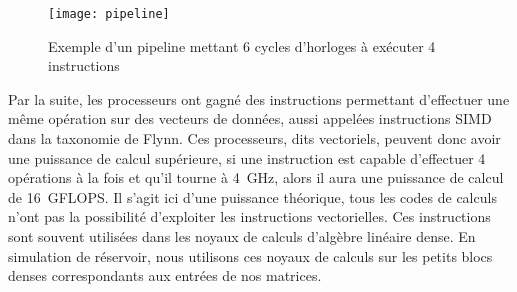 \begin{figure}[!h]
  \centering
  \texttt{[image: pipeline]}
  \caption{Exemple d'un pipeline mettant 6 cycles d'horloges à exécuter 4 instructions}
  \label{fig:pipeline}
\end{figure}



Par la suite, les processeurs ont gagné des instructions permettant d'effectuer une même opération sur des vecteurs de données, aussi appelées instructions SIMD dans la taxonomie de Flynn.
%
Ces processeurs, dits vectoriels, peuvent donc avoir une puissance de calcul supérieure, si une instruction est capable d'effectuer 4 opérations à la fois et qu'il tourne à 4~GHz, alors il aura une puissance de calcul de 16~GFLOPS.
%
Il s'agit ici d'une puissance théorique, tous les codes de calculs n'ont pas la possibilité d'exploiter les instructions vectorielles.
%
Ces instructions sont souvent utilisées dans les noyaux de calculs d'algèbre linéaire dense.
%
En simulation de réservoir, nous utilisons ces noyaux de calculs sur les petits blocs denses correspondants aux entrées de nos matrices.
